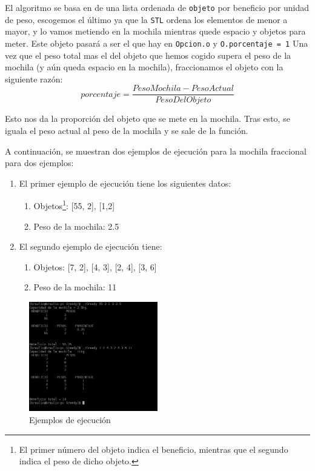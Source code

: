 \documentclass[10pt,a4paper,spanish]{report}
\theoremstyle{definition}
\theoremstyle{remark}
\begin{document}
El algoritmo se basa en de una lista ordenada de \verb|objeto| por beneficio por unidad de peso, escogemos el último ya que la \verb|STL| ordena los elementos de menor a mayor, y lo vamos metiendo en la mochila mientras quede espacio y objetos para meter. Este objeto pasará a ser el que hay en \verb|Opcion.o| y \verb|O.porcentaje = 1|  Una vez que el peso total mas el del objeto que hemos cogido supera el peso de la mochila (y aún queda espacio en la mochila), fraccionamos el objeto con la siguiente razón:
\begin{displaymath}
  porcentaje = \frac{PesoMochila - PesoActual}{PesoDelObjeto}
\end{displaymath}

Esto nos da la proporción del objeto que se mete en la mochila. Tras esto, se iguala el peso actual al peso de la mochila y se sale de la función.
{}


A continuación, se muestran dos ejemplos de ejecución para la mochila fraccional para dos ejemplos:

\begin{enumerate}[$\blacksquare$]
  \item El primer ejemplo de ejecución tiene los siguientes datos:
  \begin{enumerate}[$\spadesuit$]
    \item Objetos\footnote{El primer número del objeto indica el beneficio, mientras que el segundo indica el peso de dicho objeto.}: [55, 2], [1,2]
    \item Peso de la mochila: 2.5
  \end{enumerate}
  \item El segundo ejemplo de ejecución tiene:
  \begin{enumerate}[$\spadesuit$]
    \item Objetos: [7, 2], [4, 3], [2, 4], [3, 6]
    \item Peso de la mochila: 11
  \end{enumerate}
\end{enumerate}

\begin{center}
\begin{figure}[!h]
\centering
\includegraphics[width=0.5\textwidth]{figura3}
\caption{Ejemplos de ejecución}
\label{figura3}
\end{figure}
\end{center}
\end{document}
